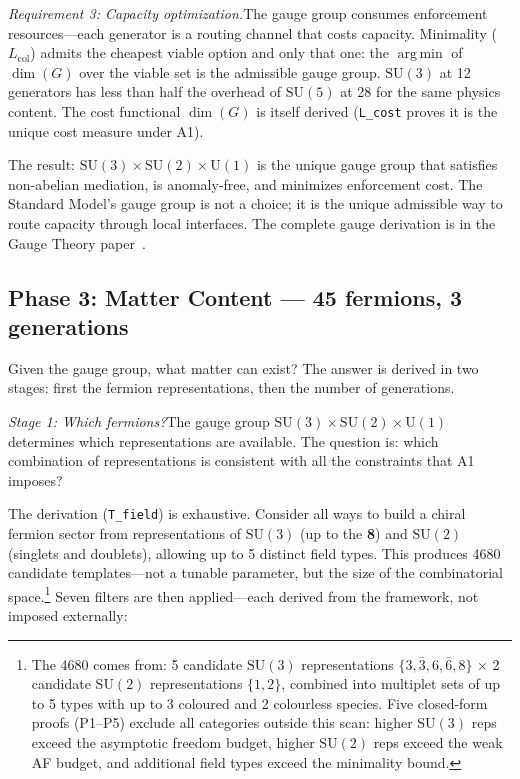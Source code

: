 \documentclass[11pt]{article}
\newcommand{\SU}{\mathrm{SU}}
\newcommand{\U}{\mathrm{U}}
\DeclareMathOperator*{\argmin}{arg\,min}
\begin{document}
\textit{Requirement 3: Capacity optimization.}\quad The gauge group consumes enforcement resources---each generator is a routing channel that costs capacity.  Minimality ($L_{\mathrm{col}}$) admits the cheapest viable option and only that one: the $\argmin$ of $\dim(G)$ over the viable set is the admissible gauge group.  $\SU(3)$ at 12 generators has less than half the overhead of $\SU(5)$ at 28 for the same physics content.  The cost functional $\dim(G)$ is itself derived (\texttt{L\_cost} proves it is the unique cost measure under A1).

The result: $\SU(3)\times\SU(2)\times\U(1)$ is the unique gauge group that satisfies non-abelian mediation, is anomaly-free, and minimizes enforcement cost.  The Standard Model's gauge group is not a choice; it is the unique admissible way to route capacity through local interfaces.  The complete gauge derivation is in the Gauge Theory paper~\cite{PGT}.


\subsection{Phase 3: Matter Content --- 45 fermions, 3 generations}

Given the gauge group, what matter can exist?  The answer is derived in two stages: first the fermion representations, then the number of generations.

\textit{Stage 1: Which fermions?}\quad The gauge group $\SU(3)\times\SU(2)\times\U(1)$ determines which representations are available.  The question is: which combination of representations is consistent with all the constraints that A1 imposes?

The derivation (\texttt{T\_field}) is exhaustive.  Consider all ways to build a chiral fermion sector from representations of $\SU(3)$ (up to the \textbf{8}) and $\SU(2)$ (singlets and doublets), allowing up to 5 distinct field types.  This produces 4680 candidate templates---not a tunable parameter, but the size of the combinatorial space.\footnote{The 4680 comes from: 5 candidate $\SU(3)$ representations $\{3, \bar{3}, 6, \bar{6}, 8\}$ $\times$ 2 candidate $\SU(2)$ representations $\{1, 2\}$, combined into multiplet sets of up to 5 types with up to 3 coloured and 2 colourless species.  Five closed-form proofs (P1--P5) exclude all categories outside this scan: higher $\SU(3)$ reps exceed the asymptotic freedom budget, higher $\SU(2)$ reps exceed the weak AF budget, and additional field types exceed the minimality bound.}  Seven filters are then applied---each derived from the framework, not imposed externally:
\end{document}
